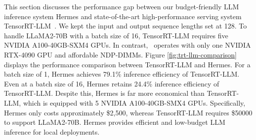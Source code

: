 This section discusses the performance gap between our budget-friendly LLM inference system Hermes and state-of-the-art high-performance serving system TensorRT-LLM~\cite{tensorrt-llm}. We kept the input and output sequence lengths set at 128. To handle LLaMA2-70B with a batch size of 16, TensorRT-LLM requires five NVIDIA A100-40GB-SXM4 GPUs. In contrast, 
\name~operates with only one NVIDIA RTX-4090 GPU and affordable NDP-DIMMs. Figure \ref{fig:trt-llm-comparison} displays the performance comparison between TensorRT-LLM and Hermes. For a batch size of 1, Hermes achieves 79.1\% inference efficiency of TensorRT-LLM. Even at a batch size of 16, Hermes retains 24.4\% inference efficiency of TensorRT-LLM. Despite this, Hermes is far more economical than TensorRT-LLM, which is equipped with 5 NVIDIA A100-40GB-SMX4 GPUs. Specifically, Hermes only costs approximately \$2,500, whereas TensorRT-LLM requires \$50000 to support LLaMA2-70B. Hermes provides efficient and low-budget LLM inference for local deployments. 

